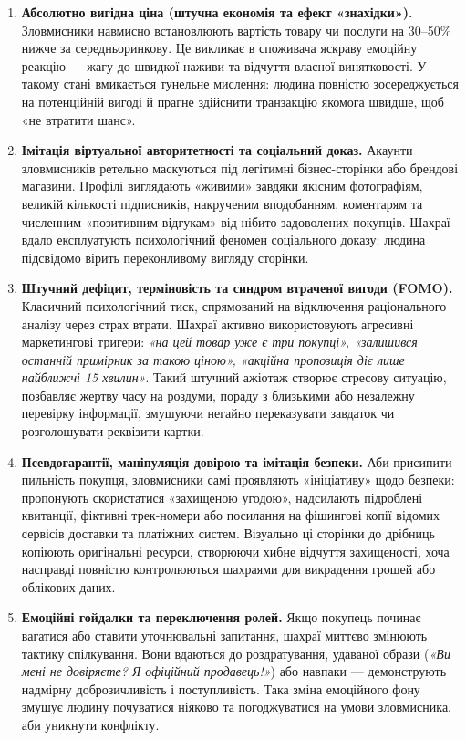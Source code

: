 \begin{enumerate}
    \item \textbf{Абсолютно вигідна ціна (штучна економія та ефект «знахідки»).} Зловмисники навмисно встановлюють вартість товару чи послуги на 30–50\% нижче за середньоринкову. Це викликає в споживача яскраву емоційну реакцію — жагу до швидкої наживи та відчуття власної винятковості. У такому стані вмикається тунельне мислення: людина повністю зосереджується на потенційній вигоді й прагне здійснити транзакцію якомога швидше, щоб «не втратити шанс». 

    \item \textbf{Імітація віртуальної авторитетності та соціальний доказ.} Акаунти зловмисників ретельно маскуються під легітимні бізнес-сторінки або брендові магазини. Профілі виглядають «живими» завдяки якісним фотографіям, великій кількості підписників, накрученим вподобанням, коментарям та численним «позитивним відгукам» від нібито задоволених покупців. Шахраї вдало експлуатують психологічний феномен соціального доказу: людина підсвідомо вірить переконливому вигляду сторінки. 

    \item \textbf{Штучний дефіцит, терміновість та синдром втраченої вигоди (FOMO).} Класичний психологічний тиск, спрямований на відключення раціонального аналізу через страх втрати. Шахраї активно використовують агресивні маркетингові тригери: \textit{«на цей товар уже є три покупці», «залишився останній примірник за такою ціною», «акційна пропозиція діє лише найближчі 15 хвилин»}. Такий штучний ажіотаж створює стресову ситуацію, позбавляє жертву часу на роздуми, пораду з близькими або незалежну перевірку інформації, змушуючи негайно переказувати завдаток чи розголошувати реквізити картки.

    \item \textbf{Псевдогарантії, маніпуляція довірою та імітація безпеки.} Аби присипити пильність покупця, зловмисники самі проявляють «ініціативу» щодо безпеки: пропонують скористатися «захищеною угодою», надсилають підроблені квитанції, фіктивні трек-номери або посилання на фішингові копії відомих сервісів доставки та платіжних систем. Візуально ці сторінки до дрібниць копіюють оригінальні ресурси, створюючи хибне відчуття захищеності, хоча насправді повністю контролюються шахраями для викрадення грошей або облікових даних.

    \item \textbf{Емоційні гойдалки та переключення ролей.} Якщо покупець починає вагатися або ставити уточнювальні запитання, шахраї миттєво змінюють тактику спілкування. Вони вдаються до роздратування, удаваної образи (\textit{«Ви мені не довіряєте? Я офіційний продавець!»}) або навпаки — демонструють надмірну доброзичливість і поступливість. Така зміна емоційного фону змушує людину почуватися ніяково та погоджуватися на умови зловмисника, аби уникнути конфлікту.
\end{enumerate}

